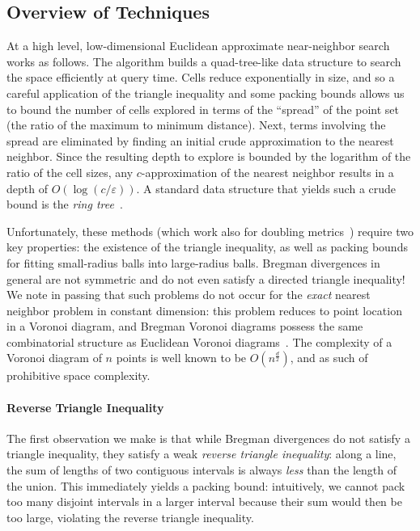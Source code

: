 \documentclass[11pt]{myclass}
\newcommand{\eps}{\varepsilon}
\begin{document}
\subsection{Overview of Techniques}
\label{ssec:intro-key-ideas}

At a high level\cite{snotes}, low-dimensional Euclidean approximate near-neighbor search  works as follows. The algorithm builds a quad-tree-like data structure to search the space efficiently at query time. Cells reduce exponentially in size, and so a careful application of the triangle inequality and some packing bounds allows us to bound the number of cells explored in terms of the ``spread'' of the point set (the ratio of the maximum to minimum distance). Next, 
terms involving the spread are eliminated by finding an initial crude approximation to the nearest neighbor. 
Since the resulting depth to explore is bounded by the logarithm of the ratio of the cell sizes, any $c$-approximation of the nearest neighbor results in a depth of $O \left(\log(c/\eps) \right)$. A standard data structure that yields such a crude bound is the \emph{ring tree}~\cite{blackbox}.

Unfortunately, these methods (which work also for doubling metrics~\cite{bounded,blackbox}) 
require two key properties: the existence of the triangle inequality, as well as packing bounds for fitting small-radius balls into large-radius balls. Bregman divergences in general are not symmetric and do not even satisfy a directed triangle inequality! We note in passing that such problems do not occur for the \emph{exact} nearest neighbor problem in constant dimension: this problem reduces to point location in a Voronoi diagram, and Bregman Voronoi diagrams possess the same combinatorial structure as Euclidean Voronoi diagrams~\cite{bvd}. The complexity of a Voronoi diagram of $n$ points is well known to be $O(n^{\frac{d}{2}})$, and as such of prohibitive space complexity.

\paragraph*{Reverse Triangle Inequality}
The first observation we make is that while Bregman divergences do not satisfy a triangle inequality, they satisfy a weak \emph{reverse triangle inequality}: 
along a line, the sum of lengths of two contiguous intervals is always \emph{less} than the length of the union. 
This immediately yields a packing bound: intuitively, we cannot pack too many disjoint intervals in a larger interval because their sum would then be too 
large, violating the reverse triangle inequality. 
\end{document}

